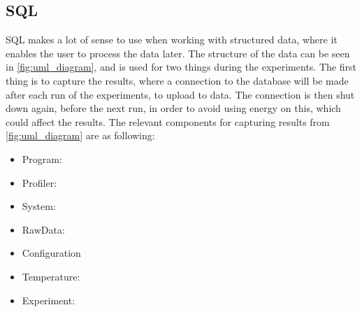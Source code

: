 \subsection{SQL}\label{subsec:sql}

SQL makes a lot of sense to use when working with structured data, where it enables the user to process the data later. The structure of the data can be seen in \cref{fig:uml_diagram}, and is used for two things during the experiments. The first thing is to capture the results, where a connection to the database will be made after each run of the experiments, to upload to data. The connection is then shut down again, before the next run, in order to avoid using energy on this, which could affect the results. The relevant components for capturing results from \cref*{fig:uml_diagram} are as following:

\begin{itemize}
    \item Program:
    \item Profiler:
    \item System:
    \item RawData:
    \item Configuration
    \item Temperature:
    \item Experiment:
\end{itemize}


